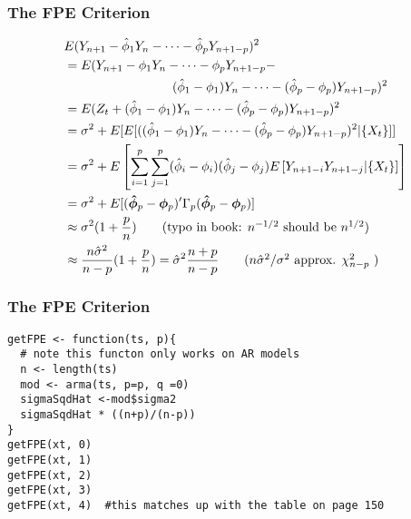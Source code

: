 \documentclass{beamer}
\begin{document}
\begin{frame}
\frametitle{The FPE Criterion}

\begin{align*}
& E(Y_{n+1} -\hat{\phi}_1Y_n -\cdots - \hat{\phi}_p Y_{n+1-p} )^2 \\
&= E(Y_{n+1} -\phi_1Y_n -\cdots - \phi_p Y_{n+1-p} - \\
& \hspace{30mm} (\hat{\phi}_1 - \phi_1)Y_n - \cdots - (\hat{\phi}_p - \phi_p) Y_{n+1-p}  )^2 \\
&= E( Z_t +  (\hat{\phi}_1 - \phi_1)Y_n - \cdots - (\hat{\phi}_p - \phi_p) Y_{n+1-p}  )^2 \\
&= \sigma^2 + E[E[((\hat{\phi}_1 - \phi_1)Y_n - \cdots - (\hat{\phi}_p - \phi_p) Y_{n+1-p} )^2  | \{X_t\}   ]] \\
&= \sigma^2 + E\left[ \sum_{i=1}^p \sum_{j=1}^p (\hat{\phi}_i - \phi_i)(\hat{\phi}_j - \phi_j)E\left[ Y_{n+1-i}Y_{n+1-j}    |\{X_t\}  \right]  \right] \\
&= \sigma^2 + E[(\bm{\hat{\phi}}_p -\bm{\phi}_p )' \Gamma_p  (\bm{\hat{\phi}}_p -\bm{\phi}_p )] \\
&\approx \sigma^2 ( 1 + \frac{p}{n}) \tag{typo in book: $n^{-1/2}$ should be $n^{1/2}$} \\
&\approx \frac{n \hat{\sigma}^2}{n-p} ( 1 + \frac{p}{n}) = \hat{\sigma}^2 \frac{n+p}{n-p}  \tag{$n \hat{\sigma}^2/\sigma^2$ approx. $\chi^2_{n-p}$ } \\
\end{align*}

\end{frame}


\begin{frame}[fragile]
\frametitle{The FPE Criterion}

\begin{verbatim}
getFPE <- function(ts, p){
  # note this functon only works on AR models
  n <- length(ts)
  mod <- arma(ts, p=p, q =0)
  sigmaSqdHat <-mod$sigma2
  sigmaSqdHat * ((n+p)/(n-p))
}
getFPE(xt, 0)
getFPE(xt, 1)
getFPE(xt, 2)
getFPE(xt, 3)
getFPE(xt, 4)  #this matches up with the table on page 150
\end{verbatim}

\end{frame}


\end{document}
